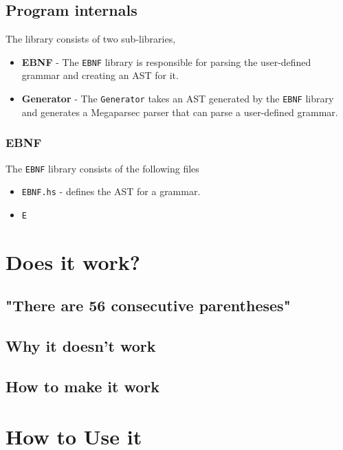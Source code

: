 \documentclass{article}
\begin{document}
\subsection{Program internals}
The library consists of two sub-libraries,
    \begin{itemize}
        \item \textbf{EBNF} - The \texttt{EBNF} library is responsible for parsing the user-defined grammar and creating an AST for it.
        \item \textbf{Generator} - The \texttt{Generator} takes an AST generated by the \texttt{EBNF} library and generates a Megaparsec parser that can parse a user-defined grammar. 
    \end{itemize}

\subsubsection*{EBNF}
The \texttt{EBNF} library consists of the following files
\begin{itemize}
    \item \texttt{EBNF.hs} - defines the AST for a grammar.
    \item \texttt{E}
\end{itemize}

\section{Does it work?}
\subsection{"There are 56 consecutive parentheses"}
    
\subsection{Why it doesn't work}
\subsection{How to make it work}

\section{How to Use it}
    

    
\end{document}
